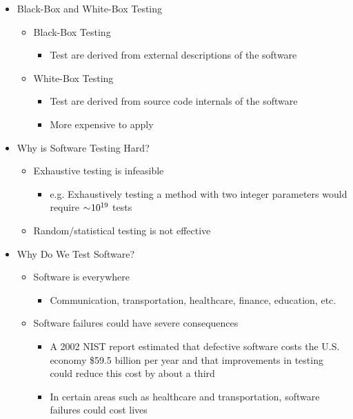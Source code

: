 \begin{itemize}
	\item Black-Box and White-Box Testing
	\begin{itemize}
		\item Black-Box Testing
		\begin{itemize}
			\item Test are derived from external descriptions of the software
		\end{itemize}
		\item White-Box Testing
		\begin{itemize}
			\item Test are derived from source code internals of the software
			\item More expensive to apply
		\end{itemize}
	\end{itemize}

	\item Why is Software Testing Hard?
	\begin{itemize}
		\item Exhaustive testing is infeasible
		\begin{itemize}
			\item e.g. Exhaustively testing a method with two integer parameters would
			require $ \sim \negmedspace 10^{19} $ tests
		\end{itemize}
		\item Random/statistical testing is not effective
	\end{itemize}

	\item Why Do We Test Software?
	\begin{itemize}
		\item Software is everywhere
		\begin{itemize}
			\item Communication, transportation, healthcare, finance, education, etc.
		\end{itemize}
		\item Software failures could have severe consequences
		\begin{itemize}
			\item A 2002 NIST report estimated that defective software costs the U.S. economy \$59.5 billion per year and that improvements in testing could reduce this cost by about a third
			\item In certain areas such as healthcare and transportation, software failures could cost lives
		\end{itemize}
	\end{itemize}


\end{itemize}
